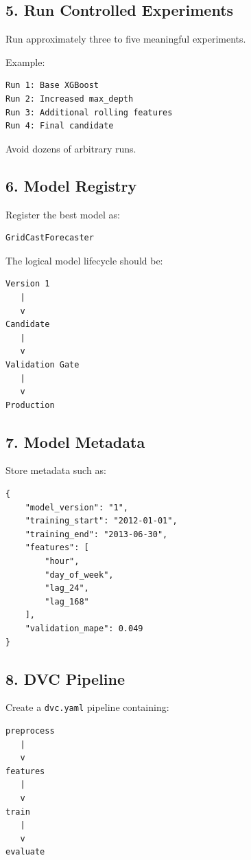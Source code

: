 \documentclass[11pt,a4paper]{article}
\begin{document}
\subsection{5. Run Controlled Experiments}

Run approximately three to five meaningful experiments.

Example:

\begin{lstlisting}
Run 1: Base XGBoost
Run 2: Increased max_depth
Run 3: Additional rolling features
Run 4: Final candidate
\end{lstlisting}

Avoid dozens of arbitrary runs.

\subsection{6. Model Registry}

Register the best model as:

\begin{lstlisting}
GridCastForecaster
\end{lstlisting}

The logical model lifecycle should be:

\begin{verbatim}
Version 1
   |
   v
Candidate
   |
   v
Validation Gate
   |
   v
Production
\end{verbatim}

\subsection{7. Model Metadata}

Store metadata such as:

\begin{lstlisting}
{
    "model_version": "1",
    "training_start": "2012-01-01",
    "training_end": "2013-06-30",
    "features": [
        "hour",
        "day_of_week",
        "lag_24",
        "lag_168"
    ],
    "validation_mape": 0.049
}
\end{lstlisting}

\subsection{8. DVC Pipeline}

Create a \texttt{dvc.yaml} pipeline containing:

\begin{verbatim}
preprocess
   |
   v
features
   |
   v
train
   |
   v
evaluate
\end{verbatim}
\end{document}
